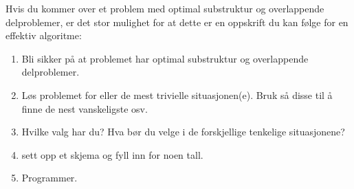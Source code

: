 Hvis du kommer over et problem med optimal substruktur og overlappende delproblemer, er det stor mulighet for at dette er en oppskrift du kan følge for en effektiv algoritme:
\begin{enumerate}
    \item Bli sikker på at problemet har optimal substruktur og overlappende delproblemer.
    \item Løs problemet for eller de mest trivielle situasjonen(e). Bruk så disse til å finne de nest vanskeligste osv.
    \item Hvilke valg har du? Hva bør du velge i de forskjellige tenkelige situasjonene?
    \item sett opp et skjema og fyll inn for noen tall.
    \item Programmer.
\end{enumerate}

